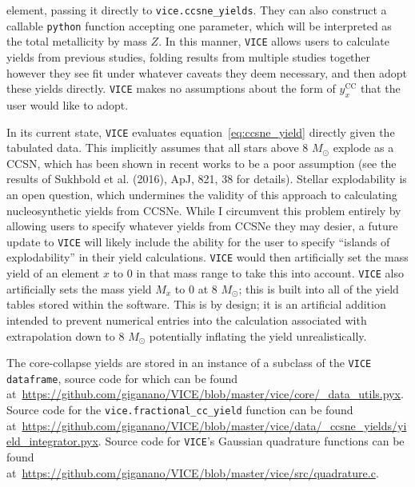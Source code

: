 \documentclass{report}
\begin{document}
element, passing it directly to \texttt{vice.ccsne\_yields}. They can also 
construct a callable \texttt{python} function accepting one parameter, which 
will be interpreted as the total metallicity by mass $Z$. In this manner, 
\texttt{VICE} allows users to calculate yields from previous studies, folding 
results from multiple studies together however they see fit under whatever 
caveats they deem necessary, and then adopt these yields directly. 
\texttt{VICE} makes no assumptions about the form of $y_x^\text{CC}$ that the 
user would like to adopt. 
\par
In its current state, \texttt{VICE} evaluates equation~\ref{eq:ccsne_yield} 
directly given the tabulated data. This 
implicitly assumes that all stars above 8 $M_\odot$ explode as a CCSN, which 
has been shown in recent works to be a poor assumption (see the results of 
Sukhbold et al. (2016), ApJ, 821, 38 for details). Stellar explodability is 
an open question, which undermines the validity of this approach to calculating 
nucleosynthetic yields from CCSNe. While I circumvent this problem entirely by 
allowing users to specify whatever yields from CCSNe they may desier, a future 
update to \texttt{VICE} will 
likely include the ability for the user to specify ``islands of explodability'' 
in their yield calculations. \texttt{VICE} would then artificially set the 
mass yield of an element $x$ to 0 in that mass range to take this into 
account. \texttt{VICE} also artificially sets the mass yield $M_x$ to 0 at 
8 $M_\odot$; this is built into all of the yield tables stored within the 
software. This is by design; it is an artificial addition intended to prevent 
numerical entries into the calculation associated with extrapolation down to 
8 $M_\odot$ potentially inflating the yield unrealistically. 
\par
The core-collapse yields are stored in an instance of a subclass of the 
\texttt{VICE dataframe}, source code for which can be found 
at~\url{https://github.com/giganano/VICE/blob/master/vice/core/_data_utils.pyx}. 
Source code for the \texttt{vice.fractional\_cc\_yield} function can be found 
at~\url{https://github.com/giganano/VICE/blob/master/vice/data/_ccsne_yields/yield_integrator.pyx}. 
Source code for \texttt{VICE}'s Gaussian quadrature functions can be found 
at~\url{https://github.com/giganano/VICE/blob/master/vice/src/quadrature.c}. 
\end{document}

